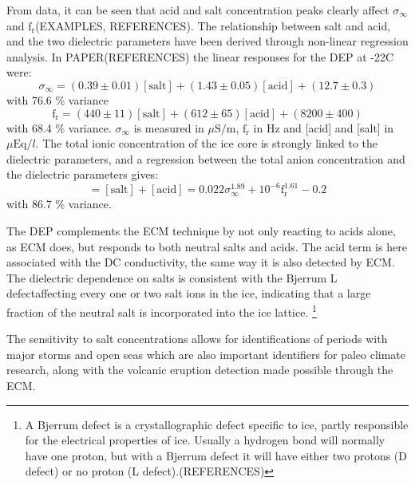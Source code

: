 \documentclass[../../CompleteThesis2/Complete_2ndDraft.tex]{subfiles}
\begin{document}
	From data, it can be seen that acid and salt concentration peaks clearly affect $\sigma_{\infty}$ and $\text{f}_{\text{r}}$(EXAMPLES, REFERENCES). The relationship between salt and acid, and the two dielectric parameters have been derived through non-linear regression analysis. In PAPER(REFERENCES) the linear responses for the DEP at -22\degree C were:
	\begin{equation}
		\sigma_{\infty} = (0.39\pm 0.01)[\text{salt}] + (1.43\pm 0.05)[\text{acid}] + (12.7\pm 0.3)
	\end{equation}
	with 76.6 \% variance
	\begin{equation}
		\text{f}_{\text{r}} = (440\pm 11)[\text{salt}] + (612\pm 65)[\text{acid}] + (8200\pm 400)
	\end{equation}
	with 68.4 \% variance. $\sigma_{\infty}$ is measured in $\mu\text{S}/\text{m}$, $\text{f}_{\text{r}}$ in Hz and [acid] and [salt] in $\mu\text{Eq}/l$.
	The total ionic concentration of the ice core is strongly linked to the dielectric parameters, and a regression between the total anion concentration and the dielectric parameters gives:
	\begin{equation}
		[\text{anions}] = [\text{salt}] + [\text{acid}] = 0.022\sigma_{\infty}^{1.89} + 10^{-6}\text{f}_{\text{r}}^{1.61} - 0.2
	\end{equation}
	with 86.7 \% variance.
	
	The DEP complements the ECM technique by not only reacting to acids alone, as ECM does, but responds to both neutral salts and acids.
	The acid term is here associated with the DC conductivity, the same way it is also detected by ECM. The dielectric dependence on salts is consistent with the Bjerrum L defect\footnotemark affecting every one or two salt ions in the ice, indicating that a large fraction of the neutral salt is incorporated into the ice lattice.
	\footnote[3]{A Bjerrum defect is a crystallographic defect specific to ice, partly responsible for the electrical properties of ice. Usually a hydrogen bond will normally have one proton, but with a Bjerrum defect it will have either two protons (D defect) or no proton (L defect).(REFERENCES)}
	
	The sensitivity to salt concentrations allows for identifications of periods with major storms and open seas which are also important identifiers for paleo climate research, along with the volcanic eruption detection made possible through the ECM.
	\newpage 
	

	
\end{document}

